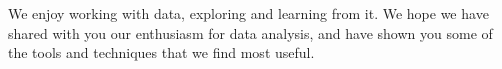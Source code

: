 \documentclass[oneside]{article}
\begin{document}
We enjoy working with data, exploring and learning from it.  We hope we have shared with you our enthusiasm for data analysis, and have shown you some of the tools and techniques that we find most useful.  








\end{document}
